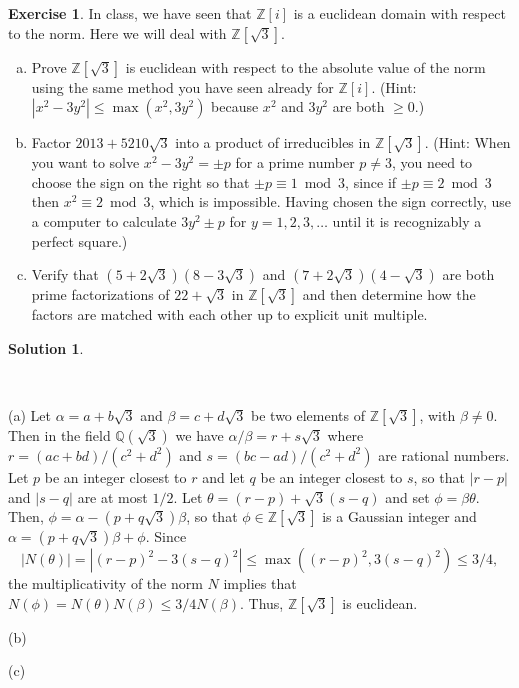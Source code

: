 \documentclass[10pt]{article}
\newcommand{\ZZ}{\mathbb Z}
\newcommand{\QQ}{\mathbb Q}
\theoremstyle{Theorem}
\theoremstyle{definition}
\newtheorem{exe}{Exercise}
\newtheorem{sol}{Solution}
\theoremstyle{remark}
\theoremstyle{custom}
\begin{document}
\begin{exe} 
In class, we have seen that $\ZZ[i]$ is a euclidean domain with respect to the norm. Here we will deal with $\ZZ[\sqrt{3}]$.
\begin{enumerate}[(a)]
\item Prove $\ZZ[\sqrt{3}]$ is euclidean with respect to the absolute 
value of the norm using the same method you have seen already for $\ZZ[i]$.  (Hint: $|x^2 - 3y^2| \leq \max(x^2, 3y^2)$ because 
$x^2$ and $3y^2$ are both $\geq 0$.)

\item Factor $2013 + 5210\sqrt{3}$ into a product of irreducibles in $\ZZ[\sqrt{3}]$.   
(Hint: When you want to solve $x^2 - 3y^2 = \pm p$ for a prime number $p \not= 3$, you need to choose the sign 
on the right so that $\pm p \equiv 1 \bmod 3$, since if $\pm p \equiv 2 \bmod 3$ then $x^2 \equiv 2 \bmod 3$, which is impossible.
Having chosen the sign correctly, use a computer to calculate $3y^2 \pm p$ for $y = 1, 2, 3, \dots$ until it is recognizably a perfect square.) 


\item Verify that $(5+2\sqrt{3})(8-3\sqrt{3})$ and $(7+2\sqrt{3})(4-\sqrt{3})$ are both 
prime factorizations of $22+\sqrt{3}$ in $\ZZ[\sqrt{3}]$ and then 
determine how the factors are matched with each other up to explicit unit multiple.
\end{enumerate}
\end{exe} 

\begin{sol}
\begin{description} ~
\item{(a)} Let $\alpha =a+b\sqrt{3}$ and $\beta=c+d\sqrt{3}$ be two elements of $\ZZ[\sqrt{3}]$, with $\beta \not= 0$. Then in the field $\QQ(\sqrt{3})$ we have $\alpha/\beta =r+s\sqrt{3}$ where $r=(ac+bd)/(c^2+d^2)$ and $s=(bc-ad)/(c^2+d^2)$ are rational numbers. Let $p$ be an integer closest to $r$ and let $q$ be an integer closest to $s$, so that $|r-p|$ and $|s-q|$ are at most $1/2$. Let $\theta =(r-p)+\sqrt{3}(s-q)$ and set $\phi=\beta \theta$. Then, $\phi=\alpha -(p+q\sqrt{3})\beta$, so that $\phi\in \ZZ[\sqrt{3}]$ is a Gaussian integer and $\alpha=(p+q\sqrt{3})\beta +\phi$. Since 
\[|N(\theta)|=|(r-p)^2-3(s-q)^2|\leq \max ((r-p)^2,3(s-q)^2)\leq 3/4 ,\] 
the multiplicativity of the norm $N$ implies that $N(\phi)=N(\theta)N(\beta)\leq 3/4 N(\beta )$. Thus, $\ZZ[\sqrt{3}]$ is euclidean. 
\item{(b)}
\item{(c)}
\end{description}
\end{sol}
\end{document}
